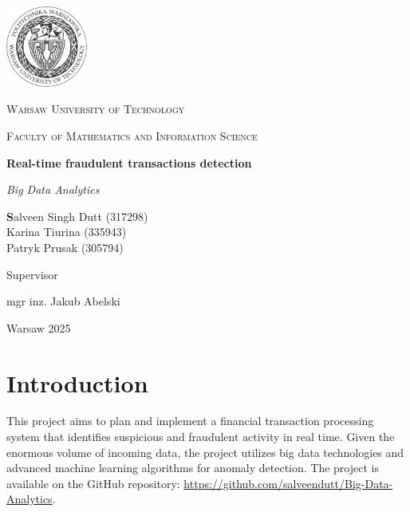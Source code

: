 \documentclass[12pt,a4paper, hidelinks]{article}
\begin{document}
\begin{titlepage}
    \centering
    \vspace*{0.5 cm}
    \includegraphics[width=0.20\textwidth]{images/logo.png}\par\vspace{1cm}
    {\scshape\LARGE Warsaw University of Technology \par}
    \vspace{1cm}
    {\scshape\Large Faculty of Mathematics and Information Science\par}
    \vspace{1.5cm}
    {\huge\bfseries Real-time fraudulent transactions detection \par}
    \vspace{1cm}
    {\Large\itshape Big Data Analytics\par}
    \vfill
    \begin{flushright}

    {\Large\textbf Salveen Singh Dutt (317298) \\ Karina Tiurina (335943)  \\ Patryk Prusak (305794) \par}
    \vfill
    {Supervisor\par}
    {\Large mgr inz. Jakub Abelski \par}
    
    \end{flushright}
    \vfill
    {\large Warsaw 2025\par}
    \vspace{1cm}
\end{titlepage}

\newpage

\tableofcontents
\newpage %

\section*{Introduction}

This project aims to plan and implement a financial transaction processing system that identifies suspicious and fraudulent activity in real time. Given the enormous volume of incoming data, the project utilizes big data technologies and advanced machine learning algorithms for anomaly detection. The project is available on the GitHub repository: \href{https://github.com/salveendutt/Big-Data-Analytics}{https://github.com/salveendutt/Big-Data-Analytics}.
\end{document}
